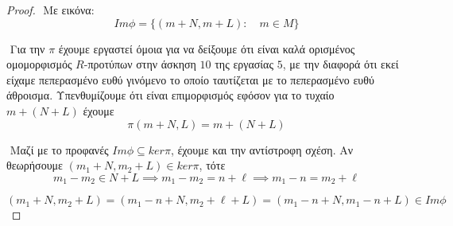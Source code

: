 \documentclass[oneside,a4paper]{article}
\begin{document}
\begin{proof}
	$ $\newline
	Με εικόνα:
	$$Im\phi = \{(m+N,m+L): \quad m \in M\} $$

	$ $\newline
	Για την $\pi$ έχουμε εργαστεί όμοια για να δείξουμε ότι είναι καλά ορισμένος ομομορφισμός $R$-προτύπων στην άσκηση $10$ της εργασίας $5$, με την διαφορά ότι εκεί είχαμε πεπερασμένο ευθύ γινόμενο το οποίο ταυτίζεται με το πεπερασμένο ευθύ άθροισμα. Υπενθυμίζουμε ότι είναι επιμορφισμός εφόσον για το τυχαίο $m + (N+L)$ έχουμε
	$$\pi(m + N, L) = m + (N+L)$$
	
	$ $\newline
	Μαζί με το προφανές $Im\phi \subseteq ker\pi$, έχουμε και την αντίστροφη σχέση. Αν θεωρήσουμε $(m_1 +N, m_2 +L) \in ker\pi$, τότε
	$$m_1 - m_2 \in N + L \implies m_1 - m_2 = n + \ell \implies m_1 - n = m_2 + \ell$$

	$$(m_1 + N, m_2 + L) = (m_1 - n + N, m_2 + \ell + L) = (m_1 - n + N, m_1 - n + L) \in Im\phi$$

\end{proof}
\pagebreak
\end{document}
